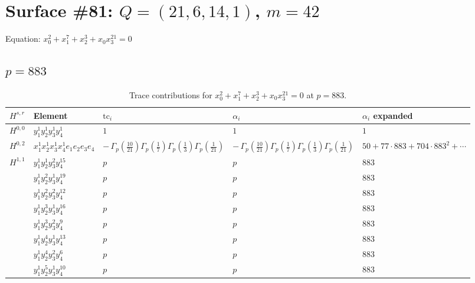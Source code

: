 \documentclass[11pt]{article}
\begin{document}
\newpage

\section*{Surface \#81: $Q=(21, 6, 14, 1)$, $m=42$}

Equation: $x_0^{2} + x_1^{7} + x_2^{3} + x_0 x_3^{21} = 0$

\subsection*{$p = 883$}

\begin{table}[ht]
\centering
\caption{Trace contributions for $x_0^{2} + x_1^{7} + x_2^{3} + x_0 x_3^{21} = 0$ at $p=883$.}\label{tab:deformed-81}
\renewcommand{\arraystretch}{1.1}
{\scriptsize
\begin{tabular}{@{}lllll@{}}
\toprule
$H^{s,r}$ & Element & $\mathrm{tc}_i$ & $\alpha_i$ & $\alpha_i$ expanded \\
\midrule
$H^{0,0}$ & $y_{1}^{1} y_{2}^{1} y_{3}^{1} y_{4}^{1}$ & $1$ & $1$ & $1$ \\
\midrule
$H^{0,2}$ & $x_{1}^{1} x_{2}^{1} x_{3}^{1} x_{4}^{1}  e_{1} e_{2} e_{3} e_{4}$ & $- \, \Gamma_p \left( \frac{10}{21} \right) \Gamma_p \left( \frac{1}{7} \right) \Gamma_p \left( \frac{1}{3} \right) \Gamma_p \left( \frac{1}{21} \right)$ & $- \, \Gamma_p \left( \frac{10}{21} \right) \Gamma_p \left( \frac{1}{7} \right) \Gamma_p \left( \frac{1}{3} \right) \Gamma_p \left( \frac{1}{21} \right)$ & $50{+}77{\cdot}883{+}704{\cdot}883^{2}{+}\cdots$ \\
\midrule
$H^{1,1}$ & $y_{1}^{1} y_{2}^{1} y_{3}^{2} y_{4}^{15}$ & $p \,$ & $p \,$ & $883$ \\
 & $y_{1}^{1} y_{2}^{2} y_{3}^{1} y_{4}^{19}$ & $p \,$ & $p \,$ & $883$ \\
 & $y_{1}^{1} y_{2}^{2} y_{3}^{2} y_{4}^{12}$ & $p \,$ & $p \,$ & $883$ \\
 & $y_{1}^{1} y_{2}^{3} y_{3}^{1} y_{4}^{16}$ & $p \,$ & $p \,$ & $883$ \\
 & $y_{1}^{1} y_{2}^{3} y_{3}^{2} y_{4}^{9}$ & $p \,$ & $p \,$ & $883$ \\
 & $y_{1}^{1} y_{2}^{4} y_{3}^{1} y_{4}^{13}$ & $p \,$ & $p \,$ & $883$ \\
 & $y_{1}^{1} y_{2}^{4} y_{3}^{2} y_{4}^{6}$ & $p \,$ & $p \,$ & $883$ \\
 & $y_{1}^{1} y_{2}^{5} y_{3}^{1} y_{4}^{10}$ & $p \,$ & $p \,$ & $883$ \\

\end{tabular}}
\end{table}
\end{document}
